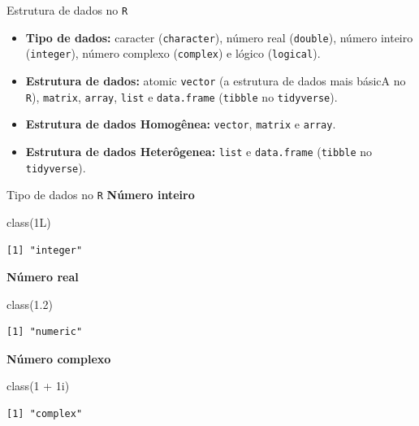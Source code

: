 \documentclass[
  10pt,
  ignorenonframetext,
]{beamer}
\newenvironment{Shaded}{\begin{snugshade}}{\end{snugshade}}
\newcommand{\DecValTok}[1]{\textcolor[rgb]{0.68,0.00,0.00}{#1}}
\newcommand{\FloatTok}[1]{\textcolor[rgb]{0.68,0.00,0.00}{#1}}
\newcommand{\FunctionTok}[1]{\textcolor[rgb]{0.28,0.35,0.67}{#1}}
\newcommand{\NormalTok}[1]{\textcolor[rgb]{0.00,0.23,0.31}{#1}}
\newcommand{\SpecialCharTok}[1]{\textcolor[rgb]{0.37,0.37,0.37}{#1}}
\providecommand{\tightlist}{%
  \setlength{\itemsep}{0pt}\setlength{\parskip}{0pt}}\usepackage{longtable,booktabs,array}
\begin{document}
\begin{frame}[fragile]{Estrutura de dados no \texttt{R}}
\protect\hypertarget{estrutura-de-dados-no-r}{}
\begin{itemize}
\tightlist
\item
  \textbf{Tipo de dados:} caracter (\texttt{character}), número real
  (\texttt{double}), número inteiro (\texttt{integer}), número complexo
  (\texttt{complex}) e lógico (\texttt{logical}).
\item
  \textbf{Estrutura de dados:} atomic \texttt{vector} (a estrutura de
  dados mais básicA no \texttt{R}), \texttt{matrix}, \texttt{array},
  \texttt{list} e \texttt{data.frame} (\texttt{tibble} no
  \texttt{tidyverse}).
\item
  \textbf{Estrutura de dados Homogênea:} \texttt{vector},
  \texttt{matrix} e \texttt{array}.
\item
  \textbf{Estrutura de dados Heterôgenea:} \texttt{list} e
  \texttt{data.frame} (\texttt{tibble} no \texttt{tidyverse}).
\end{itemize}
\end{frame}

\begin{frame}[fragile]{Tipo de dados no \texttt{R}}
\protect\hypertarget{tipo-de-dados-no-r}{}
\textbf{Número inteiro}

\begin{Shaded}
\begin{Highlighting}[]
\FunctionTok{class}\NormalTok{(1L)}
\end{Highlighting}
\end{Shaded}

\begin{verbatim}
[1] "integer"
\end{verbatim}

\textbf{Número real}

\begin{Shaded}
\begin{Highlighting}[]
\FunctionTok{class}\NormalTok{(}\FloatTok{1.2}\NormalTok{)}
\end{Highlighting}
\end{Shaded}

\begin{verbatim}
[1] "numeric"
\end{verbatim}

\textbf{Número complexo}

\begin{Shaded}
\begin{Highlighting}[]
\FunctionTok{class}\NormalTok{(}\DecValTok{1} \SpecialCharTok{+}\NormalTok{ 1i)}
\end{Highlighting}
\end{Shaded}

\begin{verbatim}
[1] "complex"
\end{verbatim}
\end{frame}
\end{document}
